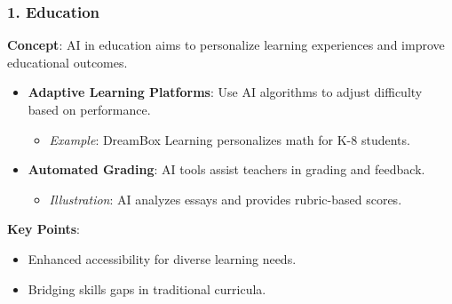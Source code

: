 \documentclass[aspectratio=169]{beamer}
\begin{document}
\begin{frame}[fragile]
    \frametitle{1. Education}
    \textbf{Concept}: AI in education aims to personalize learning experiences and improve educational outcomes.
    
    \begin{itemize}
        \item \textbf{Adaptive Learning Platforms}: Use AI algorithms to adjust difficulty based on performance.
        \begin{itemize}
            \item \textit{Example}: DreamBox Learning personalizes math for K-8 students.
        \end{itemize}
        
        \item \textbf{Automated Grading}: AI tools assist teachers in grading and feedback.
        \begin{itemize}
            \item \textit{Illustration}: AI analyzes essays and provides rubric-based scores.
        \end{itemize}
    \end{itemize}
    
    \textbf{Key Points}:
    \begin{itemize}
        \item Enhanced accessibility for diverse learning needs.
        \item Bridging skills gaps in traditional curricula.
    \end{itemize}
\end{frame}
\end{document}
